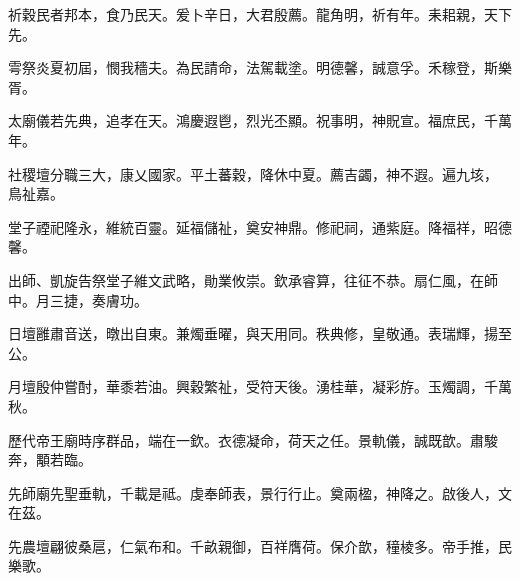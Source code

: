 \begin{pinyinscope}
祈穀民者邦本，食乃民天。爰卜辛日，大君殷薦。龍角明，祈有年。耒耜親，天下先。

雩祭炎夏初屆，憫我穡夫。為民請命，法駕載塗。明德馨，誠意孚。禾稼登，斯樂胥。

太廟儀若先典，追孝在天。鴻慶遐鬯，烈光丕顯。祝事明，神貺宣。福庶民，千萬年。

社稷壇分職三大，康乂國家。平土蕃穀，降休中夏。薦吉蠲，神不遐。遍九垓，鳥祉嘉。

堂子禋祀隆永，維統百靈。延福儲祉，奠安神鼎。修祀祠，通紫庭。降福祥，昭德馨。

出師、凱旋告祭堂子維文武略，勛業攸崇。欽承睿算，往征不恭。扇仁風，在師中。月三捷，奏膚功。

日壇雝肅音送，暾出自東。兼燭垂曜，與天用同。秩典修，皇敬通。表瑞輝，揚至公。

月壇殷仲嘗酎，華黍若油。興穀繁祉，受符天後。湧桂華，凝彩斿。玉燭調，千萬秋。

歷代帝王廟時序群品，端在一欽。衣德凝命，荷天之任。景軌儀，誠既歆。肅駿奔，顒若臨。

先師廟先聖垂軌，千載是祗。虔奉師表，景行行止。奠兩楹，神降之。啟後人，文在茲。

先農壇翩彼桑扈，仁氣布和。千畝親御，百祥膺荷。保介歆，穜棱多。帝手推，民樂歌。


\end{pinyinscope}